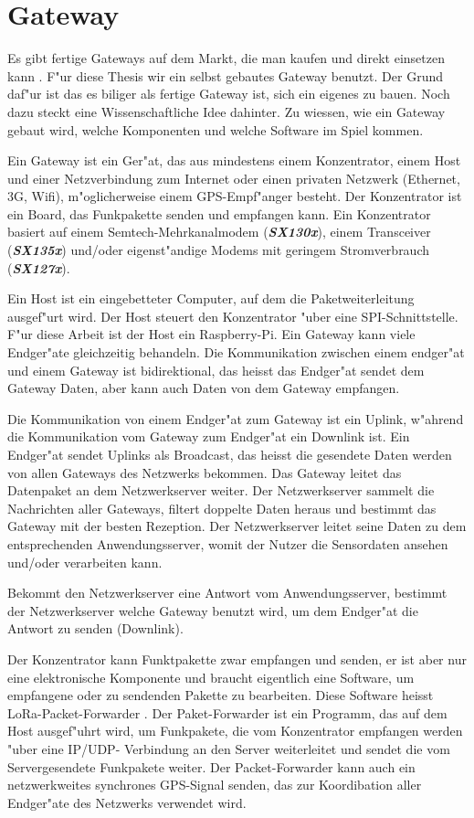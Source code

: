 \section{Gateway}\label{Gateway}

Es gibt fertige Gateways auf dem Markt, die man kaufen und direkt einsetzen kann . F"ur diese Thesis wir ein selbst gebautes Gateway benutzt. Der Grund daf"ur ist das es biliger als fertige Gateway ist, sich ein eigenes zu bauen. Noch dazu steckt eine Wissenschaftliche Idee dahinter. Zu wiessen, wie ein Gateway gebaut wird, welche Komponenten und welche Software im Spiel kommen.  

Ein Gateway ist ein Ger"at, das aus mindestens einem Konzentrator, einem Host und einer Netzverbindung zum Internet oder einen privaten Netzwerk (Ethernet, 3G, Wifi), m"oglicherweise einem GPS-Empf"anger besteht. Der Konzentrator ist ein Board, das Funkpakette senden und empfangen kann. Ein Konzentrator basiert auf einem Semtech-Mehrkanalmodem (\textbf{\textit{SX130x}}), einem Transceiver (\textbf{\textit{SX135x}}) und/oder eigenst"andige Modems mit geringem Stromverbrauch (\textbf{\textit{SX127x}}).  

Ein Host ist ein eingebetteter Computer, auf dem die Paketweiterleitung ausgef"urt wird. Der Host steuert den Konzentrator "uber eine SPI-Schnittstelle. F"ur diese Arbeit ist der Host ein Raspberry-Pi. Ein Gateway kann viele Endger"ate gleichzeitig behandeln. Die Kommunikation zwischen einem endger"at und einem Gateway ist bidirektional, das heisst das Endger"at sendet dem Gateway Daten, aber kann auch Daten von dem Gateway empfangen.

Die Kommunikation von einem Endger"at zum Gateway ist ein Uplink, w"ahrend die Kommunikation vom Gateway zum Endger"at ein Downlink ist.
Ein Endger"at sendet Uplinks als Broadcast, das heisst die gesendete Daten werden von allen Gateways des Netzwerks bekommen. Das Gateway leitet das Datenpaket an dem Netzwerkserver weiter. Der Netzwerkserver sammelt die Nachrichten aller Gateways, filtert doppelte Daten heraus und bestimmt das Gateway mit der besten Rezeption. Der Netzwerkserver leitet seine Daten zu dem entsprechenden Anwendungsserver, womit der Nutzer die Sensordaten ansehen und/oder verarbeiten kann.

Bekommt den Netzwerkserver eine Antwort vom Anwendungsserver, bestimmt der Netzwerkserver welche Gateway benutzt wird, um dem Endger"at die Antwort zu senden (Downlink).

Der Konzentrator kann Funktpakette zwar empfangen und senden, er ist aber nur eine elektronische Komponente und braucht eigentlich eine Software, um empfangene oder zu sendenden Pakette zu bearbeiten. Diese Software heisst LoRa-Packet-Forwarder \cite{paketForwarder}. 
Der Paket-Forwarder ist ein Programm, das auf dem Host ausgef"uhrt wird, um Funkpakete, die vom Konzentrator empfangen werden "uber eine IP/UDP- Verbindung an den Server weiterleitet und sendet die vom Servergesendete Funkpakete weiter. Der Packet-Forwarder kann auch ein netzwerkweites synchrones GPS-Signal senden, das zur Koordibation aller Endger"ate des Netzwerks verwendet wird. 


